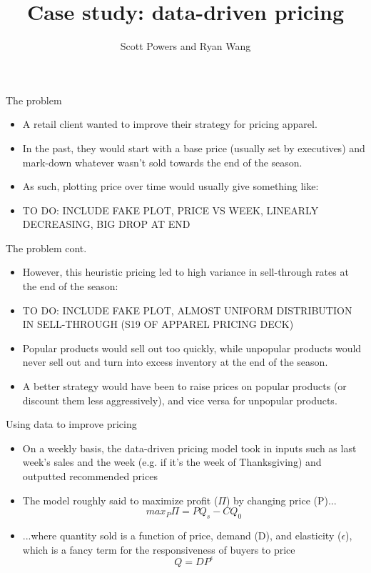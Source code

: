 \documentclass{beamer}
\title{Case study: data-driven pricing}
\author{Scott Powers and Ryan Wang}
\begin{document}
\begin{frame}
\titlepage
\end{frame}

\begin{frame}{The problem}
\begin{itemize}
	\item A retail client wanted to improve their strategy for pricing apparel. 
	\item In the past, they would start with a base price (usually set by executives) and mark-down whatever wasn't sold towards the end of the season.
	\item As such, plotting price over time would usually give something like:
	\item TO DO: INCLUDE FAKE PLOT, PRICE VS WEEK, LINEARLY DECREASING, BIG DROP AT END
\end{itemize}
\end{frame}

\begin{frame}{The problem cont.}
\begin{itemize}
	\item However, this heuristic pricing led to high variance in sell-through rates at the end of the season:
	\item TO DO: INCLUDE FAKE PLOT, ALMOST UNIFORM DISTRIBUTION IN SELL-THROUGH (S19 OF APPAREL PRICING DECK)
	\item Popular products would sell out too quickly, while unpopular products would never sell out and turn into excess inventory at the end of the season.
	\item A better strategy would have been to raise prices on popular products (or discount them less aggressively), and vice versa for unpopular products.
\end{itemize}
\end{frame}

\begin{frame}{Using data to improve pricing}
\begin{itemize}
	\item On a weekly basis, the data-driven pricing model took in inputs such as last week's sales and the week (e.g. if it's the week of Thanksgiving) and outputted recommended prices
	\item The model roughly said to maximize profit ($\Pi$) by changing price (P)...
	$$ max_P \Pi = PQ_s - CQ_0 $$
	\item ...where quantity sold is a function of price, demand (D), and elasticity ($\epsilon$), which is a fancy term for the responsiveness of buyers to price
	$$ Q = DP^{\epsilon} $$ 
\end{itemize}
\end{frame}
\end{document}
